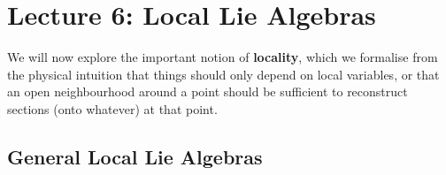 % 
\newpage
{}
\section{Lecture 6: Local Lie Algebras} %
\label{sec:lecture_6_local_lie_algebras}
% 
We will now explore the important notion of \textbf{locality}, which we formalise from the physical intuition that things should only depend on local variables, or that an open neighbourhood around a point should be sufficient to reconstruct sections (onto whatever) at that point.
% 
\subsection{General Local Lie Algebras} %
\label{sub:general_local_lie_algebras}
% 
\label{def:support}

